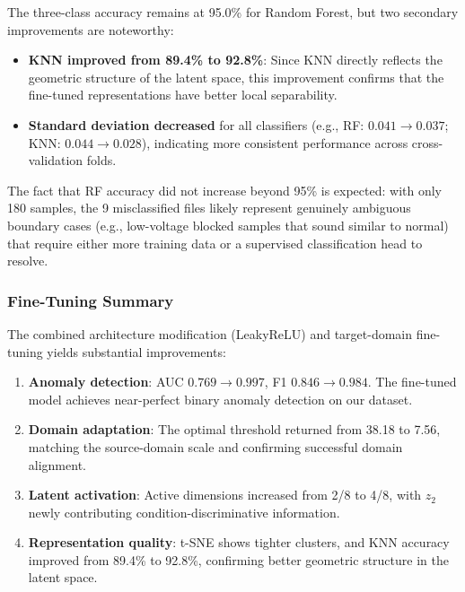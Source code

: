\documentclass[12pt, a4paper]{article}
\begin{document}
The three-class accuracy remains at 95.0\% for Random Forest, but two secondary improvements are noteworthy:
\begin{itemize}
    \item \textbf{KNN improved from 89.4\% to 92.8\%}: Since KNN directly reflects the geometric structure of the latent space, this improvement confirms that the fine-tuned representations have better local separability.
    \item \textbf{Standard deviation decreased} for all classifiers (e.g., RF: $0.041 \rightarrow 0.037$; KNN: $0.044 \rightarrow 0.028$), indicating more consistent performance across cross-validation folds.
\end{itemize}

The fact that RF accuracy did not increase beyond 95\% is expected: with only 180 samples, the 9 misclassified files likely represent genuinely ambiguous boundary cases (e.g., low-voltage blocked samples that sound similar to normal) that require either more training data or a supervised classification head to resolve.

\subsubsection{Fine-Tuning Summary}

The combined architecture modification (LeakyReLU) and target-domain fine-tuning yields substantial improvements:

\begin{enumerate}
    \item \textbf{Anomaly detection}: AUC $0.769 \rightarrow 0.997$, F1 $0.846 \rightarrow 0.984$. The fine-tuned model achieves near-perfect binary anomaly detection on our dataset.
    \item \textbf{Domain adaptation}: The optimal threshold returned from 38.18 to 7.56, matching the source-domain scale and confirming successful domain alignment.
    \item \textbf{Latent activation}: Active dimensions increased from 2/8 to 4/8, with $z_2$ newly contributing condition-discriminative information.
    \item \textbf{Representation quality}: t-SNE shows tighter clusters, and KNN accuracy improved from 89.4\% to 92.8\%, confirming better geometric structure in the latent space.
\end{enumerate}


\end{document}
